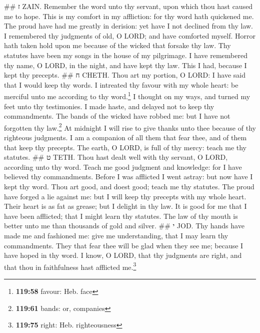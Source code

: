 \#\# ז ZAIN.  Remember the word unto thy servant, upon
which thou hast caused me to hope.  This is my comfort in
my affliction: for thy word hath quickened me.  The proud
have had me greatly in derision: yet have I not declined from thy law.
 I remembered thy judgments of old, O LORD; and have
comforted myself.  Horror hath taken hold upon me because
of the wicked that forsake thy law.  Thy statutes have
been my songs in the house of my pilgrimage.  I have
remembered thy name, O LORD, in the night, and have kept thy law.
 This I had, because I kept thy precepts. \#\# ח CHETH.
 Thou art my portion, O LORD: I have said that I would
keep thy words.  I intreated thy favour with my whole
heart: be merciful unto me according to thy word.\footnote{\textbf{119:58}
  favour: Heb. face}  I thought on my ways, and turned my
feet unto thy testimonies.  I made haste, and delayed not
to keep thy commandments.  The bands of the wicked have
robbed me: but I have not forgotten thy law.\footnote{\textbf{119:61}
  bands: or, companies}  At midnight I will rise to give
thanks unto thee because of thy righteous judgments.  I
am a companion of all them that fear thee, and of them that keep thy
precepts.  The earth, O LORD, is full of thy mercy: teach
me thy statutes. \#\# ט TETH.  Thou hast dealt well with
thy servant, O LORD, according unto thy word.  Teach me
good judgment and knowledge: for I have believed thy commandments.
 Before I was afflicted I went astray: but now have I
kept thy word.  Thou art good, and doest good; teach me
thy statutes.  The proud have forged a lie against me:
but I will keep thy precepts with my whole heart.  Their
heart is as fat as grease; but I delight in thy law.  It
is good for me that I have been afflicted; that I might learn thy
statutes.  The law of thy mouth is better unto me than
thousands of gold and silver. \#\# י JOD.  Thy hands have
made me and fashioned me: give me understanding, that I may learn thy
commandments.  They that fear thee will be glad when they
see me; because I have hoped in thy word.  I know, O
LORD, that thy judgments are right, and that thou in faithfulness hast
afflicted me.\footnote{\textbf{119:75} right: Heb. righteousness}
